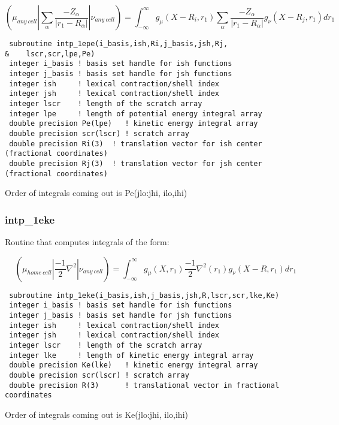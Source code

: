 \[
({\mu}_{any~cell}|\sum_{\alpha}\frac{-Z_{\alpha}}{|r_{1}-R_{\alpha}|}|{\nu}_{any~cell}) = \int_{-\infty}^{\infty} g_{\mu}(X-R_{i},r_{1})\sum_{\alpha}\frac{-Z_{\alpha}}{|r_{1}-R_{\alpha}|}g_{\nu}(X-R_{j},r_{1})dr_{1}
\]

\begin{verbatim}
 subroutine intp_1epe(i_basis,ish,Ri,j_basis,jsh,Rj,
&    lscr,scr,lpe,Pe)
 integer i_basis ! basis set handle for ish functions
 integer j_basis ! basis set handle for jsh functions
 integer ish     ! lexical contraction/shell index
 integer jsh     ! lexical contraction/shell index
 integer lscr    ! length of the scratch array
 integer lpe     ! length of potential energy integral array
 double precision Pe(lpe)   ! kinetic energy integral array
 double precision scr(lscr) ! scratch array
 double precision Ri(3)  ! translation vector for ish center (fractional coordinates)
 double precision Rj(3)  ! translation vector for jsh center (fractional coordinates)
\end{verbatim}

Order of integrals coming out is Pe(jlo:jhi, ilo,ihi)

\subsubsection{intp\_1eke}
Routine that computes integrals of the form:

\[
({\mu}_{home~cell}|\frac{-1}{2}\nabla^{2}|{\nu}_{any~cell}) = \int_{-\infty}^{\infty} g_{\mu}(X,r_{1})\frac{-1}{2}\nabla^{2}(r_{1})g_{\nu}(X-R,r_{1})dr_{1}
\]


\begin{verbatim}
 subroutine intp_1eke(i_basis,ish,j_basis,jsh,R,lscr,scr,lke,Ke)
 integer i_basis ! basis set handle for ish functions
 integer j_basis ! basis set handle for jsh functions
 integer ish     ! lexical contraction/shell index
 integer jsh     ! lexical contraction/shell index
 integer lscr    ! length of the scratch array
 integer lke     ! length of kinetic energy integral array
 double precision Ke(lke)   ! kinetic energy integral array
 double precision scr(lscr) ! scratch array
 double precision R(3)      ! translational vector in fractional coordinates
\end{verbatim}

Order of integrals coming out is Ke(jlo:jhi, ilo,ihi)

